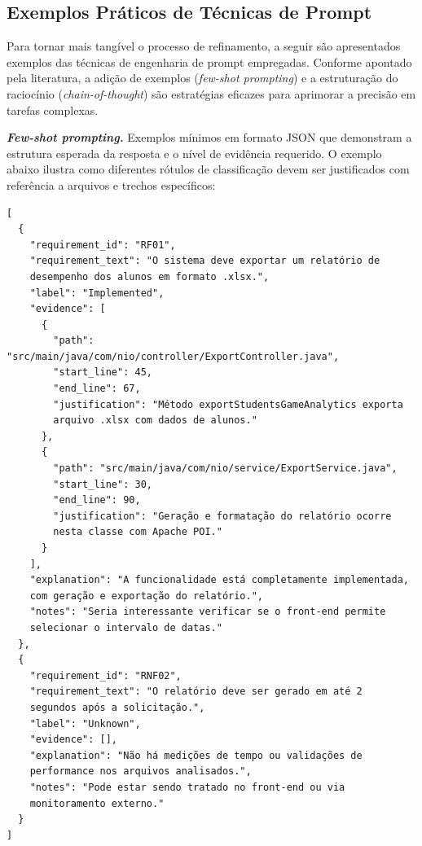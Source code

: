 \subsection{Exemplos Práticos de Técnicas de Prompt}

Para tornar mais tangível o processo de refinamento, a seguir são apresentados exemplos das técnicas de engenharia de prompt empregadas. Conforme apontado pela literatura, a adição de exemplos (\textit{few-shot prompting}) e a estruturação do raciocínio (\textit{chain-of-thought}) são estratégias eficazes para aprimorar a precisão em tarefas complexas.

\textit{\textbf{Few-shot prompting.}}
Exemplos mínimos em formato JSON que demonstram a estrutura esperada da resposta e o nível de evidência requerido. O exemplo abaixo ilustra como diferentes rótulos de classificação devem ser justificados com referência a arquivos e trechos específicos:


\begin{verbatim}
[
  {
    "requirement_id": "RF01",
    "requirement_text": "O sistema deve exportar um relatório de 
    desempenho dos alunos em formato .xlsx.",
    "label": "Implemented",
    "evidence": [
      {
        "path": "src/main/java/com/nio/controller/ExportController.java",
        "start_line": 45,
        "end_line": 67,
        "justification": "Método exportStudentsGameAnalytics exporta 
        arquivo .xlsx com dados de alunos."
      },
      {
        "path": "src/main/java/com/nio/service/ExportService.java",
        "start_line": 30,
        "end_line": 90,
        "justification": "Geração e formatação do relatório ocorre 
        nesta classe com Apache POI."
      }
    ],
    "explanation": "A funcionalidade está completamente implementada, 
    com geração e exportação do relatório.",
    "notes": "Seria interessante verificar se o front-end permite 
    selecionar o intervalo de datas."
  },
  {
    "requirement_id": "RNF02",
    "requirement_text": "O relatório deve ser gerado em até 2 
    segundos após a solicitação.",
    "label": "Unknown",
    "evidence": [],
    "explanation": "Não há medições de tempo ou validações de 
    performance nos arquivos analisados.",
    "notes": "Pode estar sendo tratado no front-end ou via 
    monitoramento externo."
  }
]
\end{verbatim}
\label{alg:prompt_examples}

\vspace{2em}


